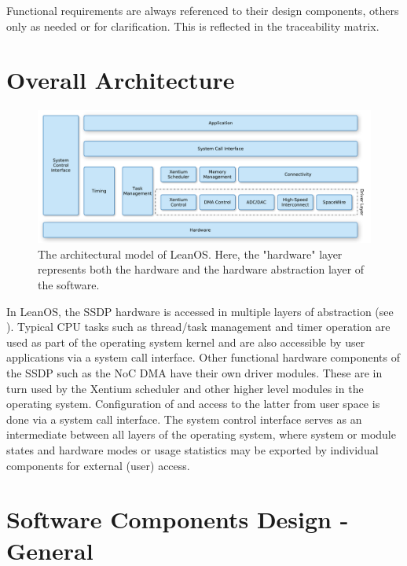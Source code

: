 \noindent
Functional requirements are always referenced to their design components, others
only as needed or for clarification. This is reflected in the traceability
matrix.



\section{Overall Architecture}


\begin{figure}[htb]
\begin{center}
	\includegraphics[width=\columnwidth]{../requirements/images/OS_logical}
	\caption{The architectural model of LeanOS. Here, the "hardware" layer
	represents both the hardware and the hardware abstraction layer of
	the software.}
	\label{fig:logical_model}
\end{center}
\end{figure}


In LeanOS, the \gls{SSDP} hardware is accessed in multiple layers of
abstraction (see ). Typical \gls{CPU} tasks such as
thread/task management and timer operation are used as part of the operating
system kernel and are also accessible by user applications via a system call
interface. Other functional hardware components of the \gls{SSDP} such as the
\gls{NoC} \gls{DMA} have their own driver modules. These are in turn used by the
\gls{Xentium} scheduler and other higher level modules in the operating system.
Configuration of and access to the latter from user space is done via a system
call interface. The system control interface serves as an intermediate between
all layers of the operating system, where system or module states and hardware
modes or usage statistics may be exported by individual components for external
(user) access.




\section{Software Components Design - General}


